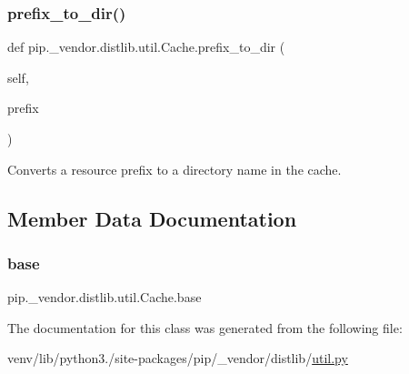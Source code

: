 \subsubsection{\texorpdfstring{prefix\+\_\+to\+\_\+dir()}{prefix\_to\_dir()}}
{\footnotesize\ttfamily def pip.\+\_\+vendor.\+distlib.\+util.\+Cache.\+prefix\+\_\+to\+\_\+dir (\begin{DoxyParamCaption}\item[{}]{self,  }\item[{}]{prefix }\end{DoxyParamCaption})}

\begin{DoxyVerb}Converts a resource prefix to a directory name in the cache.
\end{DoxyVerb}
 

\subsection{Member Data Documentation}
\mbox{\label{classpip_1_1__vendor_1_1distlib_1_1util_1_1Cache_a8c4d3c27a776a3caeb0efa0db1b1d7da}} 
\subsubsection{\texorpdfstring{base}{base}}
{\footnotesize\ttfamily pip.\+\_\+vendor.\+distlib.\+util.\+Cache.\+base}



The documentation for this class was generated from the following file\+:\begin{DoxyCompactItemize}
\item 
venv/lib/python3./site-\/packages/pip/\+\_\+vendor/distlib/\hyperlink{pip_2__vendor_2distlib_2util_8py}{util.\+py}\end{DoxyCompactItemize}
